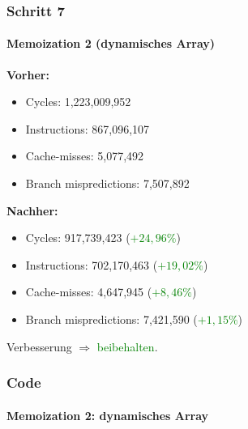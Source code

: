 \documentclass{beamer}
\newcommand{\success}[1]{\textcolor{green}{#1}}
\begin{document}
  \begin{frame}
  	\frametitle{Schritt 7}
  	\framesubtitle{Memoization 2 (dynamisches Array)}
  	\textbf{Vorher:}
		\begin{itemize}
			\item Cycles: 1,223,009,952\\
			\item Instructions: 867,096,107\\
			\item Cache-misses: 5,077,492\\
			\item Branch mispredictions: 7,507,892\\
		\end{itemize}

		\textbf{Nachher:}
		\begin{itemize}
			\item Cycles: 917,739,423 (\success{$+ 24,96\%$})\\
			\item Instructions: 702,170,463 (\success{$+ 19,02\%$})\\
			\item Cache-misses: 4,647,945 (\success{$+ 8,46\%$})\\
			\item Branch mispredictions: 7,421,590 (\success{$+ 1,15\%$})\\
		\end{itemize}
		Verbesserung $\Rightarrow$ \success{beibehalten}.
  \end{frame}

  \begin{frame}
  	\frametitle{Code}
  	\framesubtitle{Memoization 2: dynamisches Array}
  	\sMemoTwo
  \end{frame}
\end{document}
